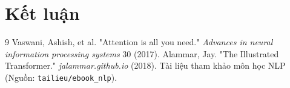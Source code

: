 \documentclass[a4paper,12pt,twoside]{report}
\begin{document}
\chapter{Kết luận}

\newpage
{}
\begin{thebibliography}{9}
Vaswani, Ashish, et al. "Attention is all you need." \textit{Advances in neural information processing systems} 30 (2017).
Alammar, Jay. "The Illustrated Transformer." \textit{jalammar.github.io} (2018).
Tài liệu tham khảo môn học NLP (Nguồn: \texttt{tailieu/ebook\_nlp}).
\end{thebibliography}
\end{document}
